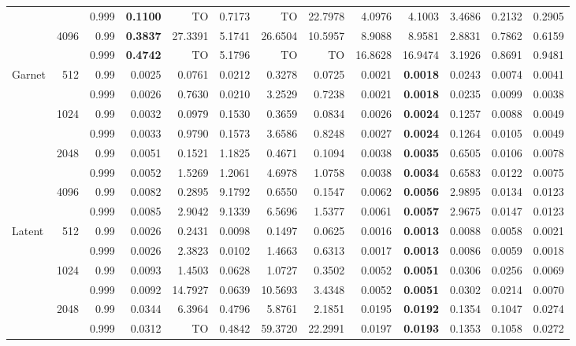 \begin{landscape}
\begin{table}[p]
\begin{tabular}{@{}lrr*{10}{r}@{}}
 &  & 0.999 & \textbf{0.1100} & TO & 0.7173 & TO & 22.7978 & 4.0976 & 4.1003 & 3.4686 & 0.2132 & 0.2905 \\
 & 4096 & 0.99 & \textbf{0.3837} & 27.3391 & 5.1741 & 26.6504 & 10.5957 & 8.9088 & 8.9581 & 2.8831 & 0.7862 & 0.6159 \\
 &  & 0.999 & \textbf{0.4742} & TO & 5.1796 & TO & TO & 16.8628 & 16.9474 & 3.1926 & 0.8691 & 0.9481 \\
\midrule
Garnet & 512 & 0.99 & 0.0025 & 0.0761 & 0.0212 & 0.3278 & 0.0725 & 0.0021 & \textbf{0.0018} & 0.0243 & 0.0074 & 0.0041 \\
 &  & 0.999 & 0.0026 & 0.7630 & 0.0210 & 3.2529 & 0.7238 & 0.0021 & \textbf{0.0018} & 0.0235 & 0.0099 & 0.0038 \\
 & 1024 & 0.99 & 0.0032 & 0.0979 & 0.1530 & 0.3659 & 0.0834 & 0.0026 & \textbf{0.0024} & 0.1257 & 0.0088 & 0.0049 \\
 &  & 0.999 & 0.0033 & 0.9790 & 0.1573 & 3.6586 & 0.8248 & 0.0027 & \textbf{0.0024} & 0.1264 & 0.0105 & 0.0049 \\
 & 2048 & 0.99 & 0.0051 & 0.1521 & 1.1825 & 0.4671 & 0.1094 & 0.0038 & \textbf{0.0035} & 0.6505 & 0.0106 & 0.0078 \\
 &  & 0.999 & 0.0052 & 1.5269 & 1.2061 & 4.6978 & 1.0758 & 0.0038 & \textbf{0.0034} & 0.6583 & 0.0122 & 0.0075 \\
 & 4096 & 0.99 & 0.0082 & 0.2895 & 9.1792 & 0.6550 & 0.1547 & 0.0062 & \textbf{0.0056} & 2.9895 & 0.0134 & 0.0123 \\
 &  & 0.999 & 0.0085 & 2.9042 & 9.1339 & 6.5696 & 1.5377 & 0.0061 & \textbf{0.0057} & 2.9675 & 0.0147 & 0.0123 \\
\midrule
Latent & 512 & 0.99 & 0.0026 & 0.2431 & 0.0098 & 0.1497 & 0.0625 & 0.0016 & \textbf{0.0013} & 0.0088 & 0.0058 & 0.0021 \\
 &  & 0.999 & 0.0026 & 2.3823 & 0.0102 & 1.4663 & 0.6313 & 0.0017 & \textbf{0.0013} & 0.0086 & 0.0059 & 0.0018 \\
 & 1024 & 0.99 & 0.0093 & 1.4503 & 0.0628 & 1.0727 & 0.3502 & 0.0052 & \textbf{0.0051} & 0.0306 & 0.0256 & 0.0069 \\
 &  & 0.999 & 0.0092 & 14.7927 & 0.0639 & 10.5693 & 3.4348 & 0.0052 & \textbf{0.0051} & 0.0302 & 0.0214 & 0.0070 \\
 & 2048 & 0.99 & 0.0344 & 6.3964 & 0.4796 & 5.8761 & 2.1851 & 0.0195 & \textbf{0.0192} & 0.1354 & 0.1047 & 0.0274 \\
 &  & 0.999 & 0.0312 & TO & 0.4842 & 59.3720 & 22.2991 & 0.0197 & \textbf{0.0193} & 0.1353 & 0.1058 & 0.0272 \\

\end{tabular}
\end{table}
\end{landscape}

